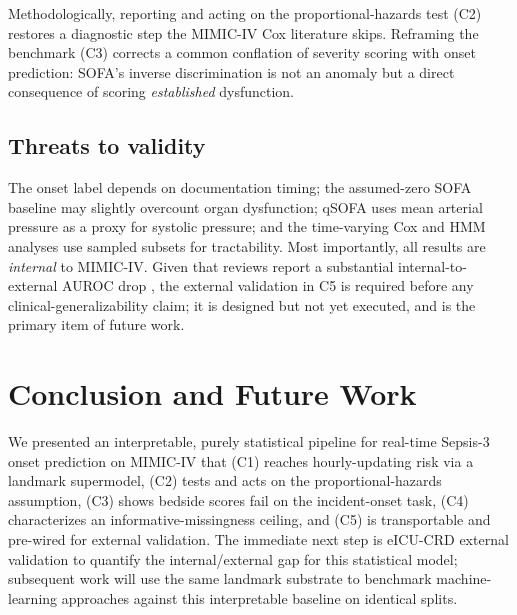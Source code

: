\documentclass[conference]{IEEEtran}
\begin{document}
Methodologically, reporting and acting on the proportional-hazards test (C2)
restores a diagnostic step the MIMIC-IV Cox literature skips. Reframing the
benchmark (C3) corrects a common conflation of severity scoring with onset
prediction: SOFA's inverse discrimination is not an anomaly but a direct
consequence of scoring \emph{established} dysfunction.

\subsection{Threats to validity}
The onset label depends on documentation timing; the assumed-zero SOFA baseline
may slightly overcount organ dysfunction; qSOFA uses mean arterial pressure as a
proxy for systolic pressure; and the time-varying Cox and HMM analyses use
sampled subsets for tractability. Most importantly, all results are
\emph{internal} to MIMIC-IV. Given that reviews report a substantial
internal-to-external AUROC drop \cite{wang2025srpm}, the external validation in
C5 is required before any clinical-generalizability claim; it is designed but
not yet executed, and is the primary item of future work.

\section{Conclusion and Future Work}
\label{sec:conclusion}
We presented an interpretable, purely statistical pipeline for real-time
Sepsis-3 onset prediction on MIMIC-IV that (C1) reaches hourly-updating risk via
a landmark supermodel, (C2) tests and acts on the proportional-hazards
assumption, (C3) shows bedside scores fail on the incident-onset task, (C4)
characterizes an informative-missingness ceiling, and (C5) is transportable and
pre-wired for external validation. The immediate next step is eICU-CRD external
validation \cite{pollard2018eicu} to quantify the internal/external gap for this
statistical model; subsequent work will use the same landmark substrate to
benchmark machine-learning approaches against this interpretable baseline on
identical splits.



\end{document}
